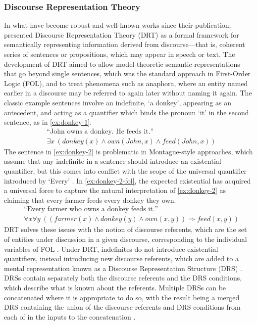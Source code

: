 \documentclass[a4paper,12pt,leqno]{article}
\begin{document}
\subsubsection{Discourse Representation Theory}\label{ssub:drt}
In what have become robust and well-known works since their publication, \citet{kamp1981theory,kamp1988discourse,Kamp1993} presented Discourse Representation Theory (DRT) as a formal framework for semantically representing information derived from discourse---that is, coherent series of sentences or propositions, which may appear in speech or text. The development of DRT aimed to allow model-theoretic semantic representations that go beyond single sentences, which was the standard approach in First-Order Logic (FOL), and to treat phenomena such as anaphora, where an entity named earlier in a discourse may be referred to again later without naming it again. The classic example sentences \citep{kamp1988discourse} involve an indefinite, `a donkey', appearing as an antecedent, and acting as a quantifier which binds the pronoun `it' in the second sentence, as in \cref{ex:donkey-1}.
\begin{subequations}
	\begin{align}
		&\text{``John owns a donkey. He feeds it.''}\label{ex:donkey-1}\\
		&\exists x ~(donkey(x) \land own(John, x) \land feed(John, x))\label{ex:donkey-1-fol}
	\end{align}
\end{subequations}
The sentence in \cref{ex:donkey-2} is problematic in Montague-style approaches, which assume that any indefinite in a sentence should introduce an existential quantifier, but this comes into conflict with the scope of the universal quantifier introduced by `Every' \citep[p, 91]{kamp1988discourse}. In \cref{ex:donkey-2-fol}, the expected existential has acquired a universal force to capture the natural interpretation of \cref{ex:donkey-2} as claiming that every farmer feeds every donkey they own.
\begin{subequations}
	\begin{align}
		&\text{``Every farmer who owns a donkey feeds it.''}\label{ex:donkey-2}\\
		&\forall x \forall y ~((farmer(x) \land donkey(y) \land own(x,y)) \Longrightarrow feed(x,y))\label{ex:donkey-2-fol}
	\end{align}
\end{subequations}
DRT solves these issues with the notion of discourse referents, which are the set of entities under discussion in a given discourse, corresponding to the individual variables of FOL \citep[p. 397]{Bird2009}. Under DRT, indefinites do not introduce existential quantifiers, instead introducing new discourse referents, which are added to a mental representation known as a Discourse Representation Structure (DRS) \citep{geurts2007discourse}. DRSs contain separately both the discourse referents and the DRS conditions, which describe what is known about the referents. Multiple DRSs can be concatenated where it is appropriate to do so, with the result being a merged DRS containing the union of the discourse referents and DRS conditions from each of in the inputs to the concatenation \citep[p. 399]{Bird2009}.
\end{document}
